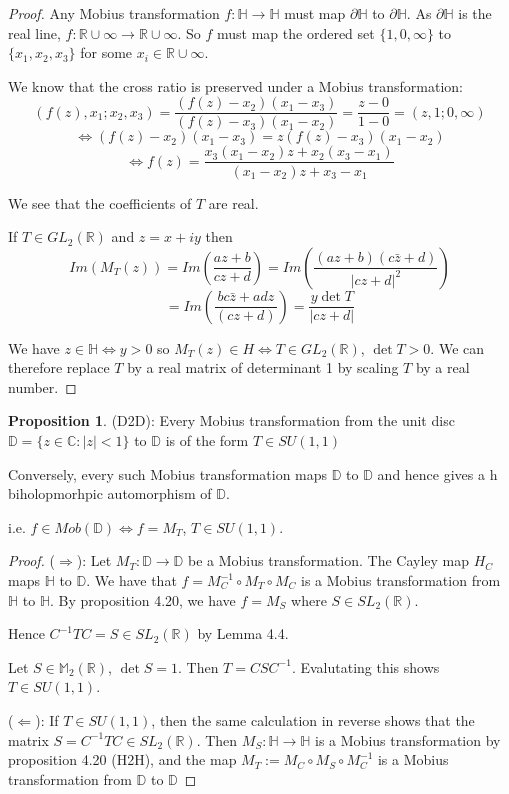 \documentclass[12pt,a4paper]{article}
\theoremstyle{definition}
\newtheorem{proposition}[definition]{Proposition}
\begin{document}
\begin{proof}
	Any Mobius transformation $f: \mathbb{H} \rightarrow \mathbb{H}$ must map $\partial \mathbb{H}$ to $\partial \mathbb{H}$. As $\partial \mathbb{H}$ is the real line, $f: \mathbb{R} \cup \infty \rightarrow \mathbb{R} \cup \infty$. So $f$ must map the ordered set $\{1, 0, \infty \}$ to $\{x_1, x_2, x_3\}$ for some $x_i \in \mathbb{R} \cup \infty$.

	We know that the cross ratio is preserved under a Mobius transformation:
	\[(f(z), x_1; x_2, x_3) = \frac{(f(z) - x_2)(x_1 - x_3)}{(f(z) - x_3)(x_1 - x_2)} = \frac{z - 0}{1 - 0} = (z, 1; 0, \infty)\]
	\[\Leftrightarrow (f(z) - x_2)(x_1 - x_3) = z (f(z) - x_3)(x_1 - x_2)\]
	\[\Leftrightarrow f(z) = \frac{x_3 (x_1 - x_2) z + x_2 (x_3 - x_1)}{(x_1 - x_2)z + x_3 - x_1}\]

	We see that the coefficients of $T$ are real.
	
	If $T \in GL_2 (\mathbb{R})$ and $z = x + iy$ then
	\[Im(M_T(z)) = Im(\frac{az + b}{cz + d}) = Im(\frac{(az + b)(c \bar{z} + d)}{|cz + d|^2})\]
	\[= Im(\frac{bc \bar{z} + adz}{(cz + d)}) = \frac{y \det T}{|cz+d|}\]

	We have $z \in \mathbb{H} \Leftrightarrow y > 0$ so $M_T(z) \in H \Leftrightarrow T \in GL_2(\mathbb{R})$, $\det T > 0$. We can therefore replace $T$ by a real matrix of determinant 1 by scaling $T$ by a real number.
\end{proof}

\begin{proposition}
	(D2D): Every Mobius transformation from the unit disc $\mathbb{D} = \{z \in \mathbb{C}: |z| < 1\}$ to $\mathbb{D}$ is of the form $T \in SU(1, 1)$

	Conversely, every such Mobius transformation maps $\mathbb{D}$ to $\mathbb{D}$ and hence gives a h
	biholopmorhpic automorphism of $\mathbb{D}$.

	i.e. $f \in Mob(\mathbb{D}) \Leftrightarrow f = M_T$, $T \in SU(1, 1)$.
\end{proposition}

\begin{proof}
	($\Rightarrow$): Let $M_T: \mathbb{D} \rightarrow \mathbb{D}$ be a Mobius transformation. The Cayley map $H_C$ maps $\mathbb{H}$ to $\mathbb{D}$. We have that $f = M_C^{-1} \circ M_T \circ M_C$ is a Mobius transformation from $\mathbb{H}$ to $\mathbb{H}$. By proposition 4.20, we have $f = M_S$ where $S \in SL_2(\mathbb{R})$.

	Hence $C^{-1} T C = S \in SL_2(\mathbb{R})$ by Lemma 4.4.

	Let $S \in \mathbb{M}_2(\mathbb{R})$, $\det S = 1$. Then $T = CSC^{-1}$. Evalutating this shows $T \in SU(1, 1)$.

	($\Leftarrow$): If $T \in SU(1, 1)$, then the same calculation in reverse shows that the matrix $S = C^{-1} T C \in SL_2(\mathbb{R})$. Then $M_S: \mathbb{H} \rightarrow \mathbb{H}$ is a Mobius transformation by proposition 4.20 (H2H), and the map $M_T := M_C \circ M_S \circ M_C^{-1}$ is a Mobius transformation from $\mathbb{D}$ to $\mathbb{D}$
\end{proof}
\end{document}
